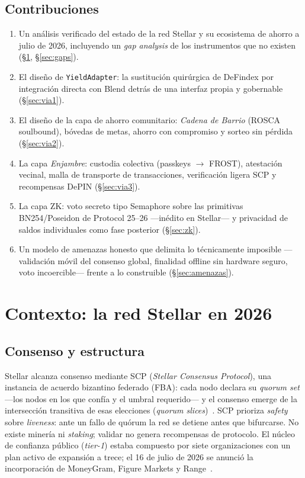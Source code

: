 \documentclass[twocolumn,10pt]{article}
\begin{document}
\subsection{Contribuciones}
\begin{enumerate}[label=\textbf{C\arabic*.}]
\item Un an\'alisis verificado del estado de la red Stellar y su ecosistema de ahorro a julio de 2026, incluyendo un \emph{gap analysis} de los instrumentos que no existen (\S\ref{sec:contexto}, \S\ref{sec:gaps}).
\item El dise\~no de \texttt{YieldAdapter}: la sustituci\'on quir\'urgica de DeFindex por integraci\'on directa con Blend detr\'as de una interfaz propia y gobernable (\S\ref{sec:via1}).
\item El dise\~no de la capa de ahorro comunitario: \emph{Cadena de Barrio} (ROSCA soulbound), b\'ovedas de metas, ahorro con compromiso y sorteo sin p\'erdida (\S\ref{sec:via2}).
\item La capa \emph{Enjambre}: custodia colectiva (passkeys $\rightarrow$ FROST), atestaci\'on vecinal, malla de transporte de transacciones, verificaci\'on ligera SCP y recompensas DePIN (\S\ref{sec:via3}).
\item La capa ZK: voto secreto tipo Semaphore sobre las primitivas BN254/Poseidon de Protocol 25--26 ---in\'edito en Stellar--- y privacidad de saldos individuales como fase posterior (\S\ref{sec:zk}).
\item Un modelo de amenazas honesto que delimita lo t\'ecnicamente imposible ---validaci\'on m\'ovil del consenso global, finalidad offline sin hardware seguro, voto incoercible--- frente a lo construible (\S\ref{sec:amenazas}).
\end{enumerate}

\section{Contexto: la red Stellar en 2026}
\label{sec:contexto}

\subsection{Consenso y estructura}

Stellar alcanza consenso mediante SCP (\emph{Stellar Consensus Protocol}), una instancia de acuerdo bizantino federado (FBA): cada nodo declara su \emph{quorum set} ---los nodos en los que conf\'ia y el umbral requerido--- y el consenso emerge de la intersecci\'on transitiva de esas elecciones (\emph{quorum slices})~\cite{scp,scpdocs}. SCP prioriza \emph{safety} sobre \emph{liveness}: ante un fallo de qu\'orum la red se detiene antes que bifurcarse. No existe miner\'ia ni \emph{staking}; validar no genera recompensas de protocolo. El n\'ucleo de confianza p\'ublico (\emph{tier-1}) estaba compuesto por siete organizaciones con un plan activo de expansi\'on a trece; el 16 de julio de 2026 se anunci\'o la incorporaci\'on de MoneyGram, Figure Markets y Range~\cite{tier1,tier1news}.
\end{document}
